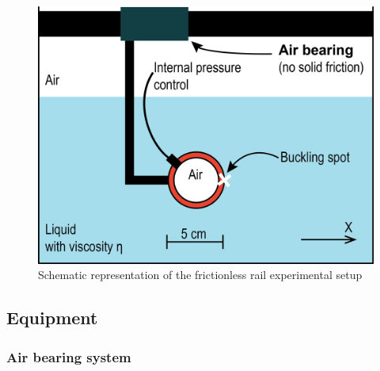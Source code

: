 \begin{figure}[H] %
	\centering%
	\includegraphics[width=\textwidth]{figures/Chapter_1/schematic_experimental_setup_fr.png}
	\caption{Schematic representation of the frictionless rail experimental setup}
	\label{fig:experimental_setup_frictionless_rail}
\end{figure}
\subsection{Equipment}
\subsubsection{Air bearing system}
